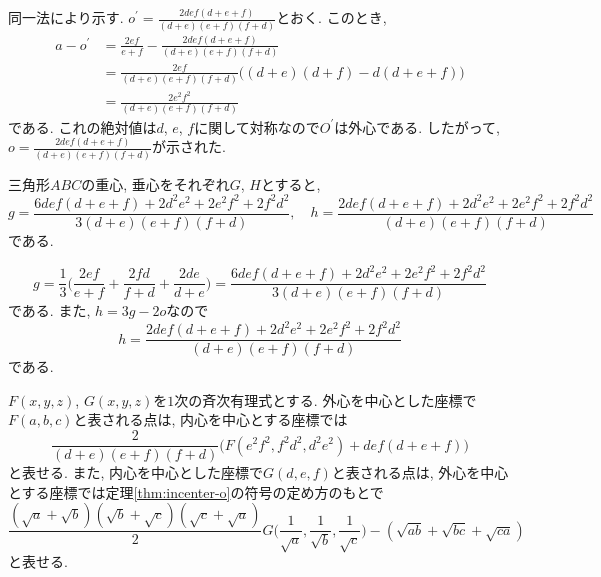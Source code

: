 \begin{prff*}
同一法により示す.
$o^\prime=\frac{2def(d+e+f)}{(d+e)(e+f)(f+d)}$とおく.
このとき,
\begin{align*}
a-o^\prime
&=\frac{2ef}{e+f}-\frac{2def(d+e+f)}{(d+e)(e+f)(f+d)}\\
&=\frac{2ef}{(d+e)(e+f)(f+d)}\bigl((d+e)(d+f)-d(d+e+f)\bigr)\\
&=\frac{2e^2f^2}{(d+e)(e+f)(f+d)}
\end{align*}
である.
これの絶対値は$d$, $e$, $f$に関して対称なので$O^\prime$は外心である.
したがって, $o=\frac{2def(d+e+f)}{(d+e)(e+f)(f+d)}$が示された.
\end{prff*}
%
\begin{bthm}
三角形$ABC$の重心, 垂心をそれぞれ$G$, $H$とすると,
\[g=\frac{6def(d+e+f)+2d^2e^2+2e^2f^2+2f^2d^2}{3(d+e)(e+f)(f+d)},\quad h=\frac{2def(d+e+f)+2d^2e^2+2e^2f^2+2f^2d^2}{(d+e)(e+f)(f+d)}\]
である.
\end{bthm}
\begin{prf*}
\[g=\frac 13\biggl(\frac{2ef}{e+f}+\frac{2fd}{f+d}+\frac{2de}{d+e}\biggr)=\frac{6def(d+e+f)+2d^2e^2+2e^2f^2+2f^2d^2}{3(d+e)(e+f)(f+d)}\]
である.
また, $h=3g-2o$なので
\[h=\frac{2def(d+e+f)+2d^2e^2+2e^2f^2+2f^2d^2}{(d+e)(e+f)(f+d)}\]
である.
\end{prf*}
%
\begin{bprop}\label{prop:translation-io}
$F(x,y,z)$, $G(x,y,z)$を$1$次の斉次有理式とする.
外心を中心とした座標で$F(a,b,c)$と表される点は, 内心を中心とする座標では
\[\frac{2}{(d+e)(e+f)(f+d)}\bigl(F(e^2f^2,f^2d^2,d^2e^2)+def(d+e+f)\bigr)\]
と表せる.
また, 内心を中心とした座標で$G(d,e,f)$と表される点は, 外心を中心とする座標では定理\ref{thm:incenter-o}の符号の定め方のもとで
\[\frac{(\sqrt{a}+\sqrt{b})(\sqrt{b}+\sqrt{c})(\sqrt{c}+\sqrt{a})}{2}G\biggl(\frac{1}{\sqrt{a}},\frac{1}{\sqrt{b}},\frac{1}{\sqrt{c}}\biggr)-(\sqrt{ab}+\sqrt{bc}+\sqrt{ca})\]
と表せる.
\end{bprop}
